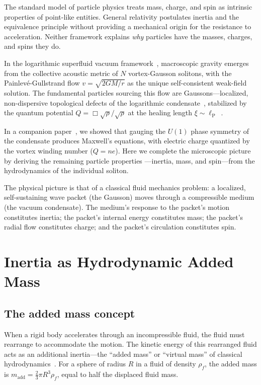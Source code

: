 \documentclass[12pt, a4paper]{article}
\newcommand{\lP}{\ell_{\mathrm{P}}}
\begin{document}
The standard model of particle physics treats mass,
charge, and spin as intrinsic properties of
point-like entities. General relativity postulates
inertia and the equivalence principle without
providing a mechanical origin for the resistance to
acceleration. Neither framework explains \emph{why}
particles have the masses, charges, and spins they do.

In the logarithmic superfluid vacuum
framework~\cite{kulangiev_gravity,kulangiev_planck},
macroscopic gravity emerges from the collective
acoustic metric of $N$ vortex-Gausson solitons, with
the Painlev\'{e}-Gullstrand flow
$v = \sqrt{2GM/r}$ as the unique self-consistent
weak-field solution. The fundamental particles
sourcing this flow are Gaussons---localized,
non-dispersive topological defects of the logarithmic
condensate~\cite{bialynicki_birula_1979,avdeenkov_2011},
stabilized by the quantum potential
$Q = \Box\sqrt{\rho}/\sqrt{\rho}$ at the healing
length $\xi \sim \lP$~\cite{kulangiev_planck}.

In a companion paper~\cite{kulangiev_maxwell}, we
showed that gauging the $U(1)$ phase symmetry of the
condensate produces Maxwell's equations, with
electric charge quantized by the vortex winding
number ($Q = ne$). Here we complete the microscopic
picture by deriving the remaining particle properties
---inertia, mass, and spin---from the hydrodynamics
of the individual soliton.

The physical picture is that of a classical fluid
mechanics problem: a localized, self-sustaining wave
packet (the Gausson) moves through a compressible
medium (the vacuum condensate). The medium's response
to the packet's motion constitutes inertia; the
packet's internal energy constitutes mass; the
packet's radial flow constitutes charge; and the
packet's circulation constitutes spin.


\section{Inertia as Hydrodynamic Added Mass}
\label{sec:inertia}

\subsection{The added mass concept}

When a rigid body accelerates through an
incompressible fluid, the fluid must rearrange to
accommodate the motion. The kinetic energy of this
rearranged fluid acts as an additional inertia---the
``added mass'' or ``virtual mass'' of classical
hydrodynamics~\cite{lamb_1932,landau_fluid}. For a
sphere of radius $R$ in a fluid of density $\rho_f$,
the added mass is $m_{\mathrm{add}} =
\frac{2}{3}\pi R^3 \rho_f$, equal to half the
displaced fluid mass.
\end{document}
